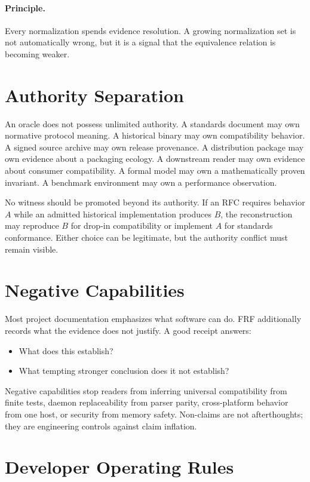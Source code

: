 \documentclass[11pt,a4paper]{article}
\newcommand{\frf}{\textsc{FRF}}
\begin{document}
\paragraph{Principle.}
Every normalization spends evidence resolution. A growing normalization set is not automatically wrong, but it is a signal that the equivalence relation is becoming weaker.

\section{Authority Separation}

An oracle does not possess unlimited authority. A standards document may own normative protocol meaning. A historical binary may own compatibility behavior. A signed source archive may own release provenance. A distribution package may own evidence about a packaging ecology. A downstream reader may own evidence about consumer compatibility. A formal model may own a mathematically proven invariant. A benchmark environment may own a performance observation.

No witness should be promoted beyond its authority. If an RFC requires behavior \(A\) while an admitted historical implementation produces \(B\), the reconstruction may reproduce \(B\) for drop-in compatibility or implement \(A\) for standards conformance. Either choice can be legitimate, but the authority conflict must remain visible.

\section{Negative Capabilities}

Most project documentation emphasizes what software can do. \frf{} additionally records what the evidence does not justify. A good receipt answers:
\begin{itemize}
\item What does this establish?
\item What tempting stronger conclusion does it not establish?
\end{itemize}

Negative capabilities stop readers from inferring universal compatibility from finite tests, daemon replaceability from parser parity, cross-platform behavior from one host, or security from memory safety. Non-claims are not afterthoughts; they are engineering controls against claim inflation.

\section{Developer Operating Rules}
\label{sec:developer-rules}
\end{document}
